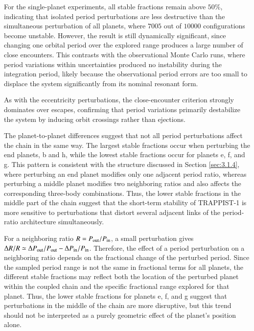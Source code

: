 \documentclass{aa}
\begin{document}
For the single-planet experiments, all stable fractions remain above $50\%$, indicating that isolated period perturbations are less destructive than the simultaneous perturbation of all planets, where $7005$ out of $10000$ configurations become unstable. However, the result is still dynamically significant, since changing one orbital period over the explored range produces a large number of close encounters. This contrasts with the observational Monte Carlo runs, where period variations within uncertainties produced no instability during the integration period, likely because the observational period errors are too small to displace the system significantly from its nominal resonant form.

As with the eccentricity perturbations, the close-encounter criterion strongly dominates over escapes, confirming that period variations primarily destabilize the system by inducing orbit crossings rather than ejections.

The planet-to-planet differences suggest that not all period perturbations affect the chain in the same way. The largest stable fractions occur when perturbing the end planets, b and h, while the lowest stable fractions occur for planets e, f, and g. This pattern is consistent with the structure discussed in Section \ref{sec:3.1.4}, where perturbing an end planet modifies only one adjacent period ratio, whereas perturbing a middle planet modifies two neighboring ratios and also affects the corresponding three-body combinations. Thus, the lower stable fractions in the middle part of the chain suggest that the short-term stability of TRAPPIST-1 is more sensitive to perturbations that distort several adjacent links of the period-ratio architecture simultaneously.


For a neighboring ratio $R=P_{\rm out}/P_{\rm in}$, a small perturbation gives $\Delta R/R \simeq \Delta P_{\rm out}/P_{\rm out}-\Delta P_{\rm in}/P_{\rm in}$. Therefore, the effect of a period perturbation on a neighboring ratio depends on the fractional change of the perturbed period. Since the sampled period range is not the same in fractional terms for all planets, the different stable fractions may reflect both the location of the perturbed planet within the coupled chain and the specific fractional range explored for that planet. Thus, the lower stable fractions for planets e, f, and g suggest that perturbations in the middle of the chain are more disruptive, but this trend should not be interpreted as a purely geometric effect of the planet's position alone.
\end{document}
